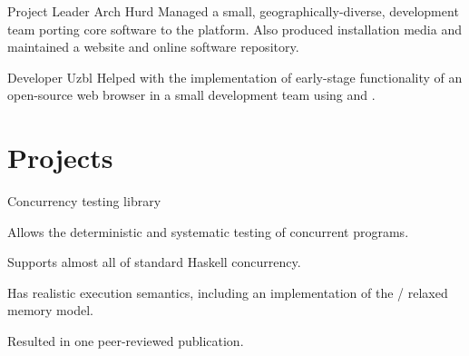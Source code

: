 \documentclass[a4paper]{cv}
\begin{document}
  {Project Leader}
  {Arch Hurd}
  {}
  {Managed a small, geographically-diverse, development team porting
    core  software to the 
    platform. Also produced installation media and maintained a
    website and online software repository.}

  {Developer}
  {Uzbl}
  {}
  {Helped with the implementation of early-stage functionality of an
    open-source web browser in a small development team using
     and .}

\section{Projects}

  {}
  {Concurrency testing library}
  {\begin{tightitemize}
    \item Allows the deterministic and systematic testing of
      concurrent  programs.
    \item Supports almost all of standard Haskell concurrency.
    \item Has realistic execution semantics, including an
      implementation of the  / 
      relaxed memory model.
    \item Resulted in one peer-reviewed publication.
    \end{tightitemize}}
\end{document}
